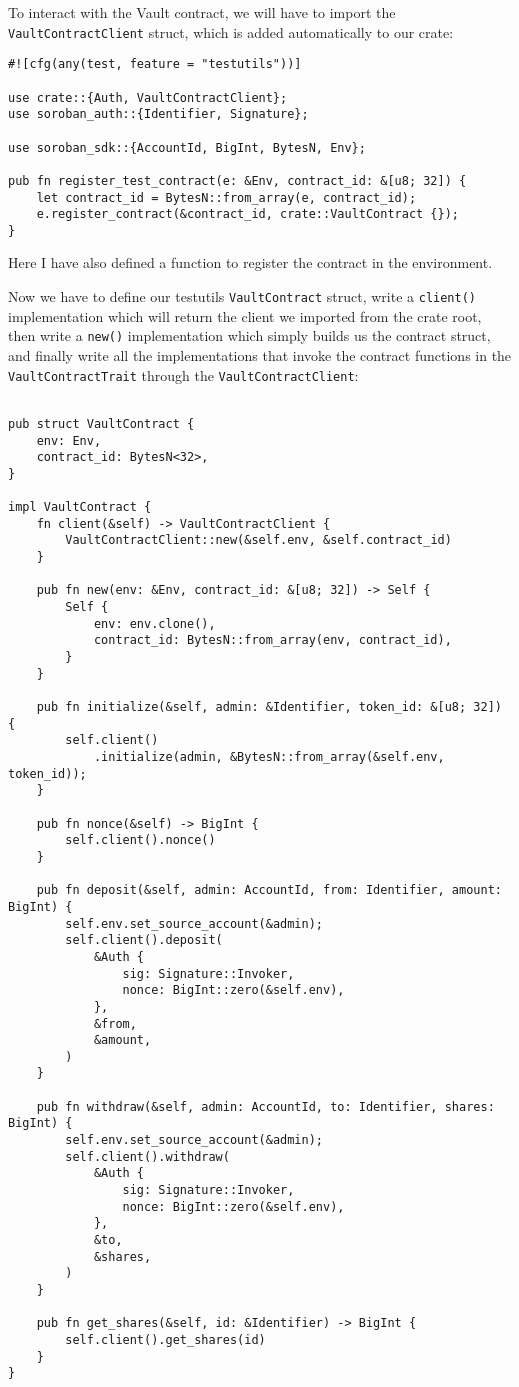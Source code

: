 \documentclass{article}
\newcommand{\inl}[1]{\lstinline{#1}}
\begin{document}
To interact with the Vault contract, we will have to import the \inl{VaultContractClient} struct, which is added automatically to our crate:

\begin{lstlisting}
#![cfg(any(test, feature = "testutils"))]

use crate::{Auth, VaultContractClient};
use soroban_auth::{Identifier, Signature};

use soroban_sdk::{AccountId, BigInt, BytesN, Env};

pub fn register_test_contract(e: &Env, contract_id: &[u8; 32]) {
    let contract_id = BytesN::from_array(e, contract_id);
    e.register_contract(&contract_id, crate::VaultContract {});
}

\end{lstlisting}

Here I have also defined a function to register the contract in the environment.

Now we have to define our testutils \inl{VaultContract} struct, write a \inl{client()} implementation which will return the client we imported from the crate root, then write a \inl{new()} implementation which simply builds us the contract struct, and finally write all the implementations that invoke the contract functions in the \inl{VaultContractTrait} through the \inl{VaultContractClient}:

\begin{lstlisting}

pub struct VaultContract {
    env: Env,
    contract_id: BytesN<32>,
}

impl VaultContract {
    fn client(&self) -> VaultContractClient {
        VaultContractClient::new(&self.env, &self.contract_id)
    }

    pub fn new(env: &Env, contract_id: &[u8; 32]) -> Self {
        Self {
            env: env.clone(),
            contract_id: BytesN::from_array(env, contract_id),
        }
    }

    pub fn initialize(&self, admin: &Identifier, token_id: &[u8; 32]) {
        self.client()
            .initialize(admin, &BytesN::from_array(&self.env, token_id));
    }

    pub fn nonce(&self) -> BigInt {
        self.client().nonce()
    }

    pub fn deposit(&self, admin: AccountId, from: Identifier, amount: BigInt) {
        self.env.set_source_account(&admin);
        self.client().deposit(
            &Auth {
                sig: Signature::Invoker,
                nonce: BigInt::zero(&self.env),
            },
            &from,
            &amount,
        )
    }

    pub fn withdraw(&self, admin: AccountId, to: Identifier, shares: BigInt) {
        self.env.set_source_account(&admin);
        self.client().withdraw(
            &Auth {
                sig: Signature::Invoker,
                nonce: BigInt::zero(&self.env),
            },
            &to,
            &shares,
        )
    }

    pub fn get_shares(&self, id: &Identifier) -> BigInt {
        self.client().get_shares(id)
    }
}

\end{lstlisting}
\end{document}
